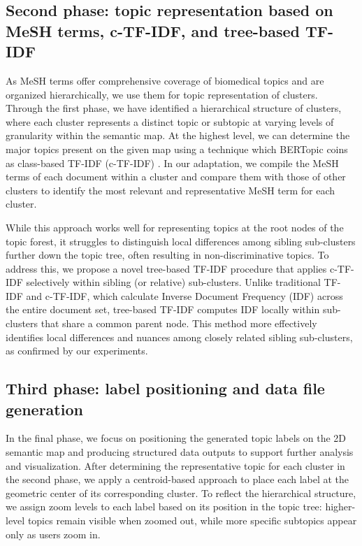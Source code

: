 \documentclass{vgtc}                          %
\begin{document}
\subsection{Second phase: topic representation based on MeSH terms, c-TF-IDF, and tree-based TF-IDF}

As MeSH terms offer comprehensive coverage of biomedical topics and are organized hierarchically, we use them for topic representation of clusters. Through the first phase, we have identified a hierarchical structure of clusters, where each cluster represents a distinct topic or subtopic at varying levels of granularity within the semantic map. 
At the highest level, we can determine the major topics present on the given map using a technique which BERTopic coins as class-based TF-IDF (c-TF-IDF) \cite{Grootendorst2022}. In our adaptation, we compile the MeSH terms of each document within a cluster and compare them with those of other clusters to identify the most relevant and representative MeSH term for each cluster.

While this approach works well for representing topics at the root nodes of the topic forest, it struggles to distinguish local differences among sibling sub-clusters further down the topic tree, often resulting in non-discriminative topics. To address this, we propose a novel tree-based TF-IDF procedure that applies c-TF-IDF selectively within sibling (or relative) sub-clusters. Unlike traditional TF-IDF and c-TF-IDF, which calculate Inverse Document Frequency (IDF) across the entire document set, tree-based TF-IDF computes IDF locally within sub-clusters that share a common parent node. This method more effectively identifies local differences and nuances among closely related sibling sub-clusters, as confirmed by our experiments.


\subsection{Third phase: label positioning and data file generation}

In the final phase, we focus on positioning the generated topic labels on the 2D semantic map and producing structured data outputs to support further analysis and visualization. After determining the representative topic for each cluster in the second phase, we apply a centroid-based approach to place each label at the geometric center of its corresponding cluster. To reflect the hierarchical structure, we assign zoom levels to each label based on its position in the topic tree: higher-level topics remain visible when zoomed out, while more specific subtopics appear only as users zoom in.
\end{document}
